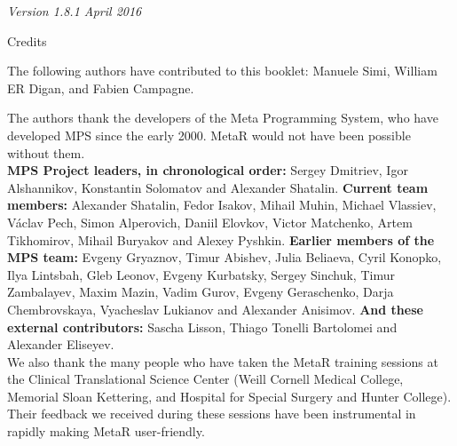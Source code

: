 \documentclass[11pt,fleqn]{book} %
\begin{document}
\noindent \textit{Version 1.8.1 April 2016}

{\newpage\thispagestyle{empty}\hbox{}}

\newpage\thispagestyle{empty}
\begin{empty}
\begin{center}\Large{Credits}\end{center}
\normalsize 


The following authors have contributed to this booklet: Manuele Simi, William ER Digan, and Fabien Campagne.


The authors thank the developers of the Meta Programming System, who have developed MPS since the early 2000. MetaR would not have been possible without them. \\
\noindent\textbf{MPS Project leaders, in chronological order:}  Sergey Dmitriev,  Igor Alshannikov, Konstantin Solomatov and Alexander Shatalin. \textbf{Current team members:} Alexander Shatalin, Fedor Isakov, Mihail Muhin, Michael Vlassiev, Václav Pech, Simon Alperovich, Daniil Elovkov, Victor Matchenko, Artem Tikhomirov, Mihail Buryakov and Alexey Pyshkin. \textbf{Earlier members of the MPS team:} Evgeny Gryaznov, Timur Abishev, Julia Beliaeva, Cyril Konopko, Ilya Lintsbah, Gleb Leonov, Evgeny Kurbatsky, Sergey Sinchuk, Timur Zambalayev, Maxim Mazin, Vadim Gurov, Evgeny Geraschenko, Darja Chembrovskaya, Vyacheslav Lukianov and Alexander Anisimov. \textbf{And these external contributors:}  Sascha Lisson, Thiago Tonelli Bartolomei and Alexander Eliseyev.\\

We also thank the many people who have taken the MetaR training sessions at the Clinical Translational Science Center (Weill Cornell Medical College, Memorial Sloan Kettering, and Hospital for Special Surgery and Hunter College). Their feedback we received during these sessions have been instrumental in rapidly making MetaR user-friendly.\\

\end{empty}

{\newpage\thispagestyle{empty}\hbox{}}
\end{document}
